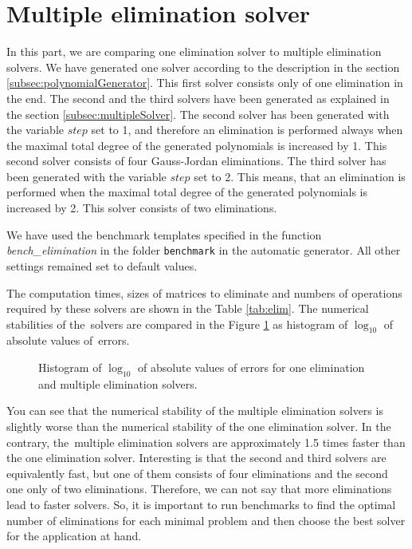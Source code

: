 \section{Multiple elimination solver}
\label{exp:elim}
In this part, we are comparing one elimination solver to multiple elimination solvers. We have generated one solver according to the description in the section \ref{subsec:polynomialGenerator}. This first solver consists only of one elimination in the end. The second and the third solvers have been generated as explained in the section \ref{subsec:multipleSolver}. The second solver has been generated with the variable $step$ set to 1, and therefore an elimination is performed always when the maximal total degree of the generated polynomials is increased by 1. This second solver consists of four Gauss-Jordan eliminations. The third solver has been generated with the variable $step$ set to 2. This means, that an elimination is performed when the maximal total degree of the generated polynomials is increased by 2. This solver consists of two eliminations.

We have used the benchmark templates specified in the function \textit{bench\_elimination} in the folder \texttt{benchmark} in the automatic generator. All other settings remained set to default values.

The computation times, sizes of matrices to eliminate and numbers of operations required by these solvers are shown in the Table \ref{tab:elim}. The numerical stabilities of the~solvers are compared in the Figure \ref{graph:elim} as histogram of $\log_{10}$ of absolute values of~errors.

\begin{figure}[ht]
  \centering
  \resizebox{0.95\textwidth}{!}{}
  \caption{Histogram of $\log_{10}$ of absolute values of errors for one elimination and multiple elimination solvers.}
  \label{graph:elim}
\end{figure}

You can see that the numerical stability of the multiple elimination solvers is slightly worse than the numerical stability of the one elimination solver. In the contrary, the~multiple elimination solvers are approximately 1.5 times faster than the one elimination solver. Interesting is that the second and third solvers are equivalently fast, but one of them consists of four eliminations and the second one only of two eliminations. Therefore, we can not say that more eliminations lead to faster solvers. So, it is important to run benchmarks to find the optimal number of eliminations for each minimal problem and then choose the best solver for the application at hand.


